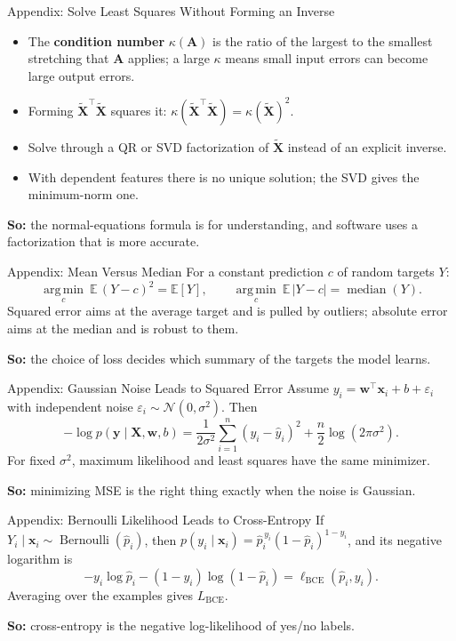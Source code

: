 \documentclass{ntuabeamer}
\newcommand{\takeaway}[1]{\par\vspace{0.3cm}\begingroup\raggedright\noindent
  {\color{courseblue}\textbf{So:}} #1\par\endgroup}
\begin{document}
\begin{frame}{Appendix: Solve Least Squares Without Forming an Inverse}
  \begin{itemize}
    \item The \textbf{condition number} $\kappa(\mathbf A)$ is the ratio of the largest to the smallest stretching that $\mathbf A$ applies;
      a large $\kappa$ means small input errors can become large output errors.
    \item Forming $\widetilde{\mathbf X}^\top\widetilde{\mathbf X}$ squares it:
      $\kappa(\widetilde{\mathbf X}^\top\widetilde{\mathbf X})=\kappa(\widetilde{\mathbf X})^2$.
    \item Solve through a QR or SVD factorization of $\widetilde{\mathbf X}$ instead of an explicit inverse.
    \item With dependent features there is no unique solution; the SVD gives the minimum-norm one.
  \end{itemize}
  \takeaway{the normal-equations formula is for understanding, and software uses a factorization that is more accurate.}
\end{frame}

\begin{frame}{Appendix: Mean Versus Median}
  For a constant prediction $c$ of random targets $Y$:
  \[
    \operatorname*{arg\,min}_c\ \mathbb E\,(Y-c)^2=\mathbb E[Y],
    \qquad
    \operatorname*{arg\,min}_c\ \mathbb E\,|Y-c|=\operatorname{median}(Y).
  \]
  Squared error aims at the average target and is pulled by outliers;
  absolute error aims at the median and is robust to them.
  \takeaway{the choice of loss decides which summary of the targets the model learns.}
\end{frame}

\begin{frame}{Appendix: Gaussian Noise Leads to Squared Error}
  Assume $y_i=\mathbf w^\top\mathbf x_i+b+\varepsilon_i$ with independent noise $\varepsilon_i\sim\mathcal N(0,\sigma^2)$. Then
  \[
    -\log p(\mathbf y\mid\mathbf X,\mathbf w,b)
    =\frac{1}{2\sigma^2}\sum_{i=1}^n(y_i-\hat y_i)^2
      +\frac n2\log(2\pi\sigma^2).
  \]
  For fixed $\sigma^2$, maximum likelihood and least squares have the same minimizer.
  \takeaway{minimizing MSE is the right thing exactly when the noise is Gaussian.}
\end{frame}

\begin{frame}{Appendix: Bernoulli Likelihood Leads to Cross-Entropy}
  If $Y_i\mid\mathbf x_i\sim\operatorname{Bernoulli}(\hat p_i)$, then
  $p(y_i\mid\mathbf x_i)=\hat p_i^{\,y_i}(1-\hat p_i)^{1-y_i}$, and its negative logarithm is
  \[
    -y_i\log\hat p_i-(1-y_i)\log(1-\hat p_i)=\ell_{\mathrm{BCE}}(\hat p_i,y_i).
  \]
  Averaging over the examples gives $L_{\mathrm{BCE}}$.
  \takeaway{cross-entropy is the negative log-likelihood of yes/no labels.}
\end{frame}
\end{document}
